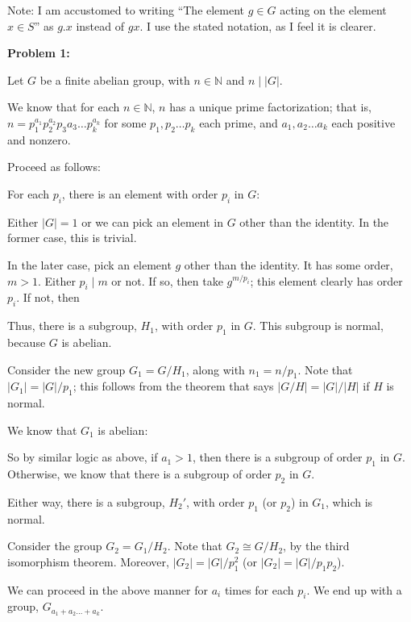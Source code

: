 \documentclass[a4paper,12pt]{article}
\newcommand{\tab}{\hspace{4mm}} %
\newcommand{\absval}[1]{\lvert #1 \rvert}
\newcommand{\N}{\mathbb{N}}
\begin{document}
Note: I am accustomed to writing ``The element $g \in G$ acting on the element $x \in S$'' as $g.x$ instead of $gx$. I use the stated notation, as I feel it is clearer.

{\bf Problem 1:}

Let $G$ be a finite abelian group, with $n \in \N$ and $n \mid \absval{G}$.

We know that for each $n \in \N$, $n$ has a unique prime factorization; that is, $n=p_1^{a_1}p_2^{a_2}p_3{a_3}\ldots p_k^{a_k}$ for some $p_1, p_2 \ldots p_k$ each prime, and $a_1, a_2 \ldots a_k$ each positive and nonzero.

Proceed as follows:

\tab For each $p_i$, there is an element with order $p_i$ in $G$:

\tab \tab Either $\absval{G} =1$ or we can pick an element in $G$ other than the identity. In the former case, this is trivial.

\tab \tab In the later case, pick an element $g$ other than the identity. It has some order, $m>1$. Either $p_i \mid m$ or not. If so, then take $g^{m/p_i}$; this element clearly has order $p_i$. If not, then %

\tab Thus, there is a subgroup, $H_1$, with order $p_1$ in $G$. This subgroup is normal, because $G$ is abelian. 

\tab Consider the new group $G_1=G/H_1$, along with $n_1 = n/p_1$. Note that $\absval{G_1} = \absval{G}/p_1$; this follows from the theorem that says $\absval{G/H} = \absval{G}/\absval{H}$ if $H$ is normal.

\tab We know that $G_1$ is abelian:

\tab \tab %

\tab So by similar logic as above, if $a_1 > 1$, then there is a subgroup of order $p_1$ in $G$. Otherwise, we know that there is a subgroup of order $p_2$ in $G$.

\tab Either way, there is a subgroup, $H_2'$, with order $p_1$ (or $p_2$) in $G_1$, which is normal. %

\tab Consider the group $G_2=G_1/H_2$. Note that $G_2 \cong G/H_2$, by the third isomorphism theorem. Moreover, $\absval{G_2} = \absval{G}/p_1^2$ (or $\absval{G_2} = \absval{G}/p_1p_2$).

\tab We can proceed in the above manner for $a_i$ times for each $p_i$. We end up with a group, $G_{a_1+a_2 \ldots + a_k}$.
\end{document}
